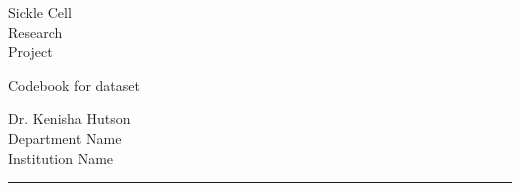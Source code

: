 \documentclass[
]{article}
\author{}
\date{\vspace{-2.5em}}
\begin{document}
\setlength{\footskip}{-1pt}


\begin{titlepage} %


    
    
    \colorbox{titlecolor}{
        \parbox[t]{0.93\textwidth}{ %
            \parbox[t]{0.91\textwidth}{ %
                \raggedleft %
                \fontsize{50pt}{80pt}\selectfont %
                \vspace{0.7cm} %
                
                Sickle Cell\\
                Research\\
                Project\\
             \vspace{4cm}
            
                Codebook for dataset\\
                
                \vspace{0.7cm} %
            }
        }
    }
    
    \vfill %
    
    
    \parbox[t]{0.93\textwidth}{ %
        \raggedleft %
        \Large %
        {\Large Dr. Kenisha Hutson}\\[4pt] %
        Department Name\\
        Institution Name\\[4pt] %
        
        \hfill\rule{0.2\linewidth}{1pt}%
    }
    
\end{titlepage}
\end{document}
